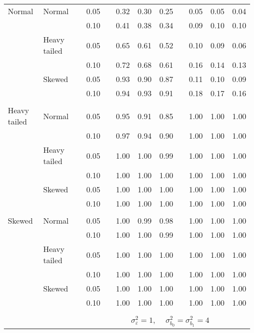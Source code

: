 \begin{table}[ht]
\begin{scriptsize}
\begin{center}
\begin{tabular}{ll p{.1cm} c p{.1cm} rrr p{.1cm} rrr}
\rowcolor{gray!20} Normal       & Normal       && 0.05 &&   0.32 & 0.30 & 0.25 && 0.05 & 0.05 & 0.04 \\ 
\rowcolor{gray!20}             &              && 0.10 &&   0.41 & 0.38 & 0.34 && 0.09 & 0.10 & 0.10 \\ 
\rowcolor{gray!20}             & Heavy tailed && 0.05 &&   0.65 & 0.61 & 0.52 && 0.10 & 0.09 & 0.06 \\ 
\rowcolor{gray!20}             &              && 0.10 &&   0.72 & 0.68 & 0.61 && 0.16 & 0.14 & 0.13 \\ 
\rowcolor{gray!20}             & Skewed       && 0.05 &&   0.93 & 0.90 & 0.87 && 0.11 & 0.10 & 0.09 \\ 
\rowcolor{gray!20}             &              && 0.10 &&   0.94 & 0.93 & 0.91 && 0.18 & 0.17 & 0.16 \\ 
             &&&&&&&&&&&\\
Heavy tailed & Normal       && 0.05 &&   0.95 & 0.91 & 0.85 && 1.00 & 1.00 & 1.00 \\ 
             &              && 0.10 &&   0.97 & 0.94 & 0.90 && 1.00 & 1.00 & 1.00 \\ 
             & Heavy tailed && 0.05 &&   1.00 & 1.00 & 0.99 && 1.00 & 1.00 & 1.00 \\ 
             &              && 0.10 &&   1.00 & 1.00 & 1.00 && 1.00 & 1.00 & 1.00 \\ 
             & Skewed       && 0.05 &&   1.00 & 1.00 & 1.00 && 1.00 & 1.00 & 1.00 \\ 
             &              && 0.10 &&   1.00 & 1.00 & 1.00 && 1.00 & 1.00 & 1.00 \\
             &&&&&&&&&&&\\ 
Skewed       & Normal       && 0.05 &&   1.00 & 0.99 & 0.98 && 1.00 & 1.00 & 1.00 \\ 
             &              && 0.10 &&   1.00 & 1.00 & 0.99 && 1.00 & 1.00 & 1.00 \\ 
             & Heavy tailed && 0.05 &&   1.00 & 1.00 & 1.00 && 1.00 & 1.00 & 1.00 \\ 
             &              && 0.10 &&   1.00 & 1.00 & 1.00 && 1.00 & 1.00 & 1.00 \\ 
             & Skewed       && 0.05 &&   1.00 & 1.00 & 1.00 && 1.00 & 1.00 & 1.00 \\ 
             &              && 0.10 &&   1.00 & 1.00 & 1.00 && 1.00 & 1.00 & 1.00 \\ 


&&&&&&&&&&&\\
& && && \multicolumn{6}{c}{$\sigma_{\varepsilon}^2 = 1$, \ \ $\sigma_{b_0}^2 = \sigma_{b_1}^2 = 4$} \\ \cline{6-12}


\end{tabular}
\end{center}
\end{scriptsize}
\end{table}
